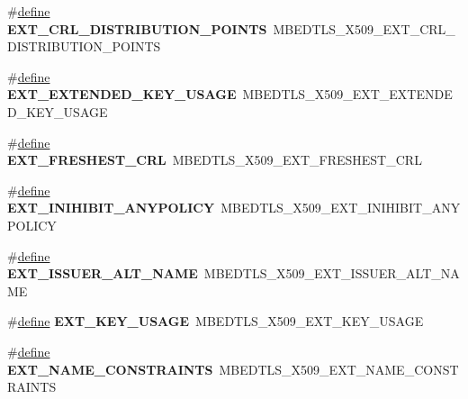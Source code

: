 \begin{DoxyCompactItemize}
\item 
\mbox{\label{compat-1_83_8h_a00ae4f8608f1369a993c14a09909254e}} 
\#\hyperlink{structdefine}{define} {\bfseries E\+X\+T\+\_\+\+C\+R\+L\+\_\+\+D\+I\+S\+T\+R\+I\+B\+U\+T\+I\+O\+N\+\_\+\+P\+O\+I\+N\+TS}~M\+B\+E\+D\+T\+L\+S\+\_\+\+X509\+\_\+\+E\+X\+T\+\_\+\+C\+R\+L\+\_\+\+D\+I\+S\+T\+R\+I\+B\+U\+T\+I\+O\+N\+\_\+\+P\+O\+I\+N\+TS
\item 
\mbox{\label{compat-1_83_8h_a97bef6a8c3abaf7755b95d997f9af98e}} 
\#\hyperlink{structdefine}{define} {\bfseries E\+X\+T\+\_\+\+E\+X\+T\+E\+N\+D\+E\+D\+\_\+\+K\+E\+Y\+\_\+\+U\+S\+A\+GE}~M\+B\+E\+D\+T\+L\+S\+\_\+\+X509\+\_\+\+E\+X\+T\+\_\+\+E\+X\+T\+E\+N\+D\+E\+D\+\_\+\+K\+E\+Y\+\_\+\+U\+S\+A\+GE
\item 
\mbox{\label{compat-1_83_8h_a789934a5dcd8b306a887e4b1445e4fcc}} 
\#\hyperlink{structdefine}{define} {\bfseries E\+X\+T\+\_\+\+F\+R\+E\+S\+H\+E\+S\+T\+\_\+\+C\+RL}~M\+B\+E\+D\+T\+L\+S\+\_\+\+X509\+\_\+\+E\+X\+T\+\_\+\+F\+R\+E\+S\+H\+E\+S\+T\+\_\+\+C\+RL
\item 
\mbox{\label{compat-1_83_8h_a0b7304f4fdd5fa11b58018cffabe1d98}} 
\#\hyperlink{structdefine}{define} {\bfseries E\+X\+T\+\_\+\+I\+N\+I\+H\+I\+B\+I\+T\+\_\+\+A\+N\+Y\+P\+O\+L\+I\+CY}~M\+B\+E\+D\+T\+L\+S\+\_\+\+X509\+\_\+\+E\+X\+T\+\_\+\+I\+N\+I\+H\+I\+B\+I\+T\+\_\+\+A\+N\+Y\+P\+O\+L\+I\+CY
\item 
\mbox{\label{compat-1_83_8h_a1e3ae3cafc339ef7ac83aa01b7aec3b1}} 
\#\hyperlink{structdefine}{define} {\bfseries E\+X\+T\+\_\+\+I\+S\+S\+U\+E\+R\+\_\+\+A\+L\+T\+\_\+\+N\+A\+ME}~M\+B\+E\+D\+T\+L\+S\+\_\+\+X509\+\_\+\+E\+X\+T\+\_\+\+I\+S\+S\+U\+E\+R\+\_\+\+A\+L\+T\+\_\+\+N\+A\+ME
\item 
\mbox{\label{compat-1_83_8h_ac59433ad6f1280708a8409937133d4c1}} 
\#\hyperlink{structdefine}{define} {\bfseries E\+X\+T\+\_\+\+K\+E\+Y\+\_\+\+U\+S\+A\+GE}~M\+B\+E\+D\+T\+L\+S\+\_\+\+X509\+\_\+\+E\+X\+T\+\_\+\+K\+E\+Y\+\_\+\+U\+S\+A\+GE
\item 
\mbox{\label{compat-1_83_8h_aafe3736b82c3f5d6343379bb6a8ec000}} 
\#\hyperlink{structdefine}{define} {\bfseries E\+X\+T\+\_\+\+N\+A\+M\+E\+\_\+\+C\+O\+N\+S\+T\+R\+A\+I\+N\+TS}~M\+B\+E\+D\+T\+L\+S\+\_\+\+X509\+\_\+\+E\+X\+T\+\_\+\+N\+A\+M\+E\+\_\+\+C\+O\+N\+S\+T\+R\+A\+I\+N\+TS

\end{DoxyCompactItemize}
